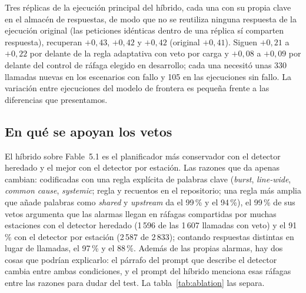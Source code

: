 \documentclass[preprint,11pt]{elsarticle}
\begin{document}
Tres réplicas de la ejecución principal del híbrido, cada una con su propia clave en el almacén de respuestas, de modo que no se reutiliza ninguna respuesta de la ejecución original (las peticiones idénticas dentro de una réplica sí comparten respuesta), recuperan $+0{,}43$, $+0{,}42$ y $+0{,}42$ (original $+0{,}41$). Siguen $+0{,}21$ a $+0{,}22$ por delante de la regla adaptativa con veto por carga y $+0{,}08$ a $+0{,}09$ por delante del control de ráfaga elegido en desarrollo; cada una necesitó unas 330 llamadas nuevas en los escenarios con fallo y 105 en las ejecuciones sin fallo. La variación entre ejecuciones del modelo de frontera es pequeña frente a las diferencias que presentamos.

\subsection{En qué se apoyan los vetos}
\label{sec:vetoes}
El híbrido sobre Fable~5.1 es el planificador más conservador con el detector heredado y el mejor con el detector por estación. Las razones que da apenas cambian: codificadas con una regla explícita de palabras clave (\emph{burst}, \emph{line-wide}, \emph{common cause}, \emph{systemic}; regla y recuentos en el repositorio; una regla más amplia que añade palabras como \emph{shared} y \emph{upstream} da el 99\,\% y el 94\,\%), el 99\,\% de sus vetos argumenta que las alarmas llegan en ráfagas compartidas por muchas estaciones con el detector heredado (1\,596 de las 1\,607 llamadas con veto) y el 91\,\% con el detector por estación (2\,587 de 2\,833); contando respuestas distintas en lugar de llamadas, el 97\,\% y el 88\,\%. Además de las propias alarmas, hay dos cosas que podrían explicarlo: el párrafo del prompt que describe el detector cambia entre ambas condiciones, y el prompt del híbrido menciona esas ráfagas entre las razones para dudar del test. La tabla~\ref{tab:ablation} las separa.
\end{document}
